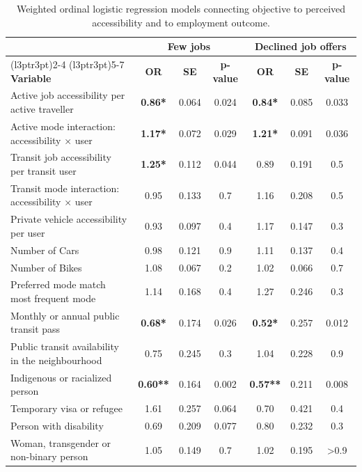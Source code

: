 \documentclass[preprint, 3p,
authoryear]{elsarticle} %
\begin{document}
\begin{table}

\begin{threeparttable}
\caption{\label{tab:unnamed-chunk-2}\label{tab:models}Weighted ordinal logistic regression models connecting objective to perceived accessibility and to employment outcome.}
\centering
\begin{tabular}[t]{lcccccc}
\toprule
\multicolumn{1}{c}{ } & \multicolumn{3}{c}{\textbf{Few jobs}} & \multicolumn{3}{c}{\textbf{Declined job offers}} \\
\cmidrule(l{3pt}r{3pt}){2-4} \cmidrule(l{3pt}r{3pt}){5-7}
\textbf{Variable} & \textbf{OR} & \textbf{SE} & \textbf{p-value} & \textbf{OR} & \textbf{SE} & \textbf{p-value}\\
\midrule
Active job accessibility per active traveller & \textbf{0.86*} & 0.064 & 0.024 & \textbf{0.84*} & 0.085 & 0.033\\
Active mode interaction: accessibility × user & \textbf{1.17*} & 0.072 & 0.029 & \textbf{1.21*} & 0.091 & 0.036\\
Transit job accessibility per transit user & \textbf{1.25*} & 0.112 & 0.044 & 0.89 & 0.191 & 0.5\\
Transit mode interaction: accessibility × user & 0.95 & 0.133 & 0.7 & 1.16 & 0.208 & 0.5\\
Private vehicle accessibility per user & 0.93 & 0.097 & 0.4 & 1.17 & 0.147 & 0.3\\
\addlinespace
Number of Cars & 0.98 & 0.121 & 0.9 & 1.11 & 0.137 & 0.4\\
Number of Bikes & 1.08 & 0.067 & 0.2 & 1.02 & 0.066 & 0.7\\
Preferred mode match most frequent mode & 1.14 & 0.168 & 0.4 & 1.27 & 0.246 & 0.3\\
Monthly or annual public transit pass & \textbf{0.68*} & 0.174 & 0.026 & \textbf{0.52*} & 0.257 & 0.012\\
Public transit availability in the neighbourhood & 0.75 & 0.245 & 0.3 & 1.04 & 0.228 & 0.9\\
\addlinespace
Indigenous or racialized person & \textbf{0.60**} & 0.164 & 0.002 & \textbf{0.57**} & 0.211 & 0.008\\
Temporary visa or refugee & 1.61 & 0.257 & 0.064 & 0.70 & 0.421 & 0.4\\
Person with disability & 0.69 & 0.209 & 0.077 & 0.80 & 0.232 & 0.3\\
Woman, transgender or non-binary person & 1.05 & 0.149 & 0.7 & 1.02 & 0.195 & >0.9\\

\end{tabular}
\end{threeparttable}
\end{table}
\end{document}
